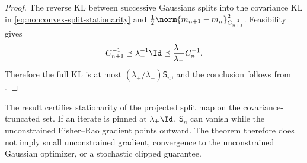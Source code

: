 \begin{proof}
The reverse KL between successive Gaussians splits into the covariance KL in
\eqref{eq:nonconvex-split-stationarity} and
\(\frac12\norm{m_{n+1}-m_n}_{C_{n+1}^{-1}}^2\).
Feasibility gives
\[
  C_{n+1}^{-1}
  \preceq\lambda_-^{-1}\Id
  \preceq\frac{\lambda_+}{\lambda_-}C_n^{-1}.
\]
Therefore the full KL is at most
\((\lambda_+/\lambda_-)\mathsf S_n\), and the conclusion follows from
.
\end{proof}

\begin{remark}[Scope]
\label{rem:nonconvex-scope}
The result certifies stationarity of the projected split map on the
covariance-truncated set.  If an iterate is pinned at
\(\lambda_+\Id\), \(\mathsf S_n\) can vanish while the unconstrained
Fisher--Rao gradient points outward.  The theorem therefore does not imply
small unconstrained gradient, convergence to the unconstrained Gaussian
optimizer, or a stochastic clipped guarantee.
\end{remark}
